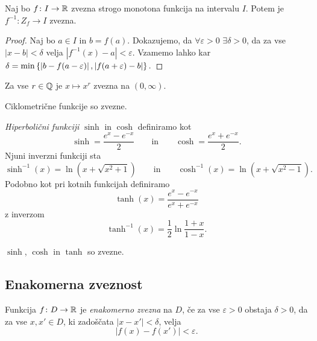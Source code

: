 \documentclass[12pt, a4paper]{article}
\begin{document}
\begin{izrek}
Naj bo $f\colon I\to\mathbb{R}$ zvezna strogo monotona funkcija na intervalu $I$. Potem je $f^{-1}:Z_f\to I$ zvezna.
\end{izrek}

\begin{proof}
Naj bo $a\in I$ in $b=f(a)$. Dokazujemo, da $\forall\varepsilon>0$ $\exists\delta>0$, da za vse $|x-b|<\delta$ velja $|f^{-1}(x)-a|<\varepsilon$. Vzamemo lahko kar $\delta=\min\left\{\left\lvert b-f(a-\varepsilon)\right\rvert,\left\lvert f(a+\varepsilon)-b\right\rvert\right\}.$
\end{proof}

\begin{posledica}
Za vse $r\in\mathbb{Q}$ je $x\mapsto x^r$ zvezna na $(0,\infty)$.
\end{posledica}

\begin{posledica}
Ciklometrične funkcije so zvezne.
\end{posledica}

\begin{definicija}
\emph{Hiperbolični funkciji} $\sinh$ in $\cosh$ definiramo kot
\[
\sinh=\frac{e^x-e^{-x}}{2}\qquad\text{in}\qquad\cosh=\frac{e^x+e^{-x}}{2}.
\]
Njuni inverzni funkciji sta
\[
\sinh^{-1}(x)=\ln(x+\sqrt{x^2+1})\qquad\text{in}\qquad\cosh^{-1}(x)=\ln(x+\sqrt{x^2-1}).
\]
Podobno kot pri kotnih funkcijah definiramo
\[
\tanh(x)=\frac{e^x-e^{-x}}{e^x+e^{-x}}
\]
z inverzom
\[
\tanh^{-1}(x)=\frac{1}{2}\ln\frac{1+x}{1-x}.
\]
\end{definicija}

\begin{posledica}
$\sinh$, $\cosh$ in $\tanh$ so zvezne.
\end{posledica}

\newpage

\subsection{Enakomerna zveznost}

\begin{okvir}
\begin{definicija}
Funkcija $f\colon D\to\mathbb{R}$ je \emph{enakomerno zvezna} na $D$, če za vse $\varepsilon>0$ obstaja $\delta>0$, da za vse $x,x'\in D$, ki zadoščata $|x-x'|<\delta$, velja
\[
|f(x)-f(x')|<\varepsilon.
\]
\end{definicija}
\end{okvir}
\end{document}
